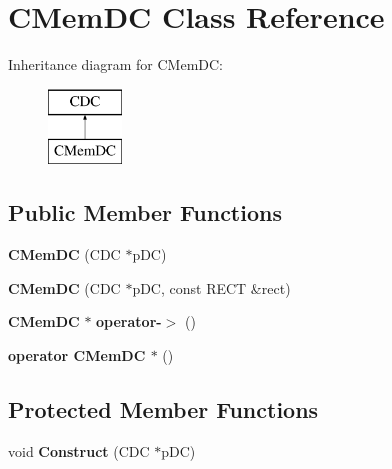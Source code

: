 \section{C\+Mem\+DC Class Reference}
\label{class_c_mem_d_c}
Inheritance diagram for C\+Mem\+DC\+:\begin{figure}[H]
\begin{center}
\leavevmode
\includegraphics[height=2.000000cm]{class_c_mem_d_c}
\end{center}
\end{figure}
\subsection*{Public Member Functions}
\begin{DoxyCompactItemize}
\item 
\mbox{\label{class_c_mem_d_c_a9a9176d74f42b8b15436f0e2e12b822c}} 
{\bfseries C\+Mem\+DC} (C\+DC $\ast$p\+DC)
\item 
\mbox{\label{class_c_mem_d_c_acbd9b41f656faec2e18903f0df820ef6}} 
{\bfseries C\+Mem\+DC} (C\+DC $\ast$p\+DC, const R\+E\+CT \&rect)
\item 
\mbox{\label{class_c_mem_d_c_a381b3b0b2333cd4b3f01dae2309c8aec}} 
\textbf{ C\+Mem\+DC} $\ast$ {\bfseries operator-\/$>$} ()
\item 
\mbox{\label{class_c_mem_d_c_a6847afed50cc7eb6a4e7a57e61a85295}} 
{\bfseries operator C\+Mem\+D\+C $\ast$} ()
\end{DoxyCompactItemize}
\subsection*{Protected Member Functions}
\begin{DoxyCompactItemize}
\item 
\mbox{\label{class_c_mem_d_c_a7fbb6e8d8606dab13dc2bdc5a856e3aa}} 
void {\bfseries Construct} (C\+DC $\ast$p\+DC)
\end{DoxyCompactItemize}
